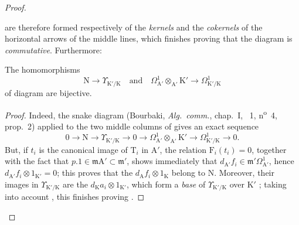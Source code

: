 \begin{proof}
\begin{env}[22.4.4.4]
are therefore formed respectively of the \emph{kernels} and the \emph{cokernels} of the horizontal arrows of the middle lines, which finishes proving that the diagram is \emph{commutative}.
Furthermore:
\end{env}

\begin{lemma}[22.4.4.7]
\label{0.22.4.4.7}
The homomorphisms
\[
  \mathrm{N}\to\Upsilon_{\mathrm{K}'/\mathrm{K}} \quad\text{and}\quad \Omega^1_{\mathrm{A}'}\otimes_{\mathrm{A}'}\mathrm{K}'\to\Omega^1_{\mathrm{K}'/\mathrm{K}}
\]
of diagram  are bijective.
\end{lemma}

\begin{proof}
Indeed, the snake diagram (Bourbaki, \emph{Alg.~comm.}, chap.~I, \textsection~1, n\textsuperscript{o}~4, prop.~2) applied to the two middle columns of  gives an exact sequence
\[
  0\to\mathrm{N}\to\Upsilon_{\mathrm{K}'/\mathrm{K}}\to 0\to\Omega^1_{\mathrm{A}'}\otimes_{\mathrm{A}'}\mathrm{K}'\to\Omega^1_{\mathrm{K}'/\mathrm{K}}\to 0.
\]
But, if $t_i$ is the canonical image of $\mathrm{T}_i$ in $\mathrm{A}'$, the relation $\mathrm{F}_i(t_i)=0$, together with the fact that $p.1\in\mathfrak{m}\mathrm{A}'\subset\mathfrak{m}'$, shows immediately that $d_{\mathrm{A}'}f_i\in\mathfrak{m}'\Omega^1_{\mathrm{A}'}$, hence $d_{\mathrm{A}'}f_i\otimes 1_{\mathrm{K}'}=0$;
this proves that the $d_{\mathrm{A}}f_i\otimes 1_\mathrm{K}$ belong to $\mathrm{N}$.
Moreover, their images in $\Upsilon_{\mathrm{K}'/\mathrm{K}}$ are the $d_\mathrm{K}a_i\otimes 1_{\mathrm{K}'}$, which form a \emph{base} of $\Upsilon_{\mathrm{K}'/\mathrm{K}}$ over $\mathrm{K}'$ ; taking into account , this finishes proving .
\end{proof}

\end{proof}

